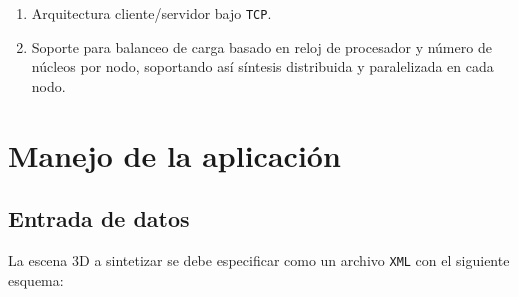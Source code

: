 \documentclass[]{article}
\begin{document}
\begin{enumerate}
 \item Arquitectura cliente/servidor bajo \texttt{TCP}.
 \item Soporte para balanceo de carga basado en reloj de procesador y número de núcleos por nodo, soportando así síntesis distribuida
 y paralelizada en cada nodo.
\end{enumerate}

\section{Manejo de la aplicación}

\subsection{Entrada de datos}

La escena 3D a sintetizar se debe especificar como un archivo \texttt{XML} con el siguiente esquema:
\end{document}
